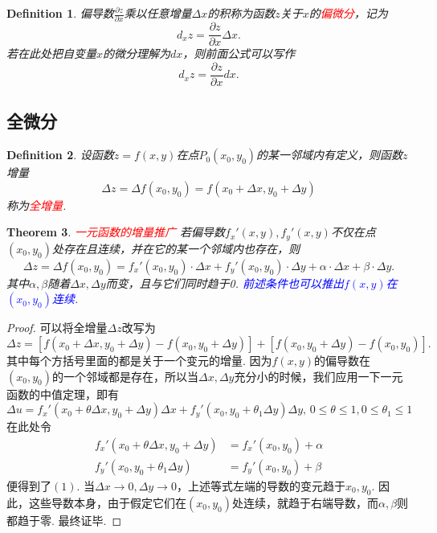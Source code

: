 \documentclass{article}
\newtheorem{theorem}{Theorem}[section]
\newtheorem{definition}[theorem]{Definition}
\newcommand{\redt}[1]{\textcolor{red}{#1}}
\newcommand{\bluet}[1]{\textcolor{blue}{#1}}
\begin{document}
\begin{definition}
\rm 偏导数$\frac{\partial z}{\partial x}$乘以任意增量$\Delta x$的积称为函数$z$关于$x$的\redt{偏微分}，记为
$$
d_x z =\frac{\partial z}{\partial x}\Delta x.
$$
若在此处把自变量$x$的微分理解为$dx$，则前面公式可以写作
$$
d_xz=\frac{\partial z}{\partial x}dx.
$$
\end{definition}

\newpage
\subsection{全微分}

\begin{definition}
\rm 设函数$z=f(x,y)$在点$P_0(x_0,y_0)$的某一邻域内有定义，则函数$z$增量
$$
\Delta z = \Delta f(x_0,y_0) = f(x_0+\Delta x, y_0+\Delta y)
$$
称为\redt{全增量}.
\end{definition}

\begin{theorem}\label{total-derivative: sufficient-cond}
\rm \redt{一元函数的增量推广} 若偏导数$f_x'(x,y),f_y'(x,y)$不仅在点$(x_0,y_0)$处存在且连续，并在它的某一个邻域内也存在，则
\begin{equation}
\Delta z = \Delta f(x_0,y_0) = f_x'(x_0,y_0)\cdot \Delta x + f_y'(x_0,y_0) \cdot \Delta y + \alpha\cdot\Delta x + \beta \cdot \Delta y.
\end{equation} 
其中$\alpha,\beta$随着$\Delta x, \Delta y$而变，且与它们同时趋于0. \bluet{前述条件也可以推出$f(x,y)$在$(x_0,y_0)$连续}. 
\end{theorem}

\begin{proof}
可以将全增量$\Delta z$改写为
$$
\Delta z = \left[f(x_0 + \Delta x, y_0 + \Delta y) - f(x_0,y_0 + \Delta y) \right]+ \left[f(x_0, y_0 + \Delta y) - f(x_0,y_0) \right]. 
$$
其中每个方括号里面的都是关于一个变元的增量. 因为$f(x,y)$的偏导数在$(x_0,y_0)$的一个邻域都是存在，所以当$\Delta x,\Delta y$充分小的时候，我们应用一下一元函数的中值定理，即有
$$
\Delta u = f_x'(x_0 + \theta\Delta x, y_0 + \Delta y)\Delta x + f_y'(x_0,y_0 + \theta_1 \Delta y)\Delta y,\, 0\leq \theta \leq 1,0\leq \theta_1 \leq 1
$$
在此处令
$$
\begin{array}{rl}
f_x'(x_0 + \theta\Delta x, y_0 + \Delta y) &=  f_x'(x_0, y_0) + \alpha \\
f_y'(x_0, y_0 + \theta_1\Delta y) &= f_y'(x_0, y_0)+\beta
\end{array}
$$
便得到了$(1)$. 当$\Delta x \to 0,\Delta y \to 0$，上述等式左端的导数的变元趋于$x_0,y_0$. 因此，这些导数本身，由于假定它们在$(x_0,y_0)$处连续，就趋于右端导数，而$\alpha,\beta$则都趋于零. 最终证毕. 
\end{proof}
\end{document}
